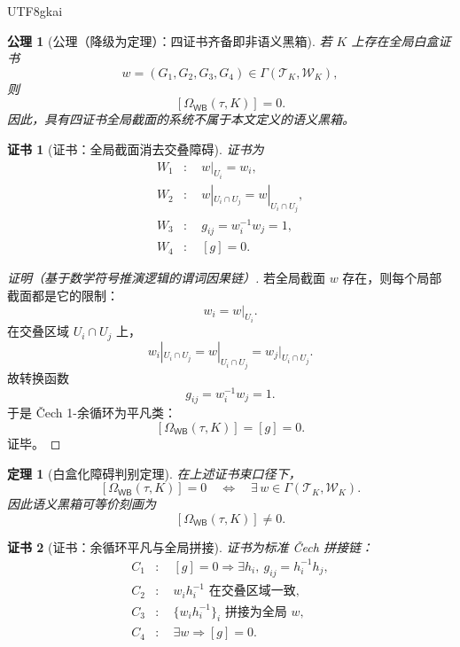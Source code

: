 \documentclass[12pt]{article}
\newtheorem{axiom}{公理}[section]
\newtheorem{theorem}{定理}[section]
\newtheorem{Certificate}{证书}[section]
\newcommand{\WB}{\mathsf{WB}}
\begin{document}
\begin{CJK*}{UTF8}{gkai}
\begin{axiom}[公理（降级为定理）：四证书齐备即非语义黑箱]
\label{ax:tex51-four-cert-whitebox}
若 \(K\) 上存在全局白盒证书
\[
  w=(G_1,G_2,G_3,G_4)\in\Gamma(\mathcal T_K,\mathcal W_K),
\]
则
\[
  [\Omega_{\WB}(\tau,K)]=0.
\]
因此，具有四证书全局截面的系统不属于本文定义的语义黑箱。
\end{axiom}

\begin{Certificate}[证书：全局截面消去交叠障碍]
\label{cert:tex51-four-cert-whitebox}
证书为
\[
\begin{aligned}
  W_1&:\quad w|_{U_i}=w_i,\\
  W_2&:\quad w|_{U_i\cap U_j}=w|_{U_i\cap U_j},\\
  W_3&:\quad g_{ij}=w_i^{-1}w_j=1,\\
  W_4&:\quad [g]=0.
\end{aligned}
\]
\end{Certificate}

\begin{proof}[证明（基于数学符号推演逻辑的谓词因果链）]
若全局截面 \(w\) 存在，则每个局部截面都是它的限制：
\[
  w_i=w|_{U_i}.
\]
在交叠区域 \(U_i\cap U_j\) 上，
\[
  w_i|_{U_i\cap U_j}
  =
  w|_{U_i\cap U_j}
  =
  w_j|_{U_i\cap U_j}.
\]
故转换函数
\[
  g_{ij}=w_i^{-1}w_j=1.
\]
于是 Čech 1-余循环为平凡类：
\[
  [\Omega_{\WB}(\tau,K)]=[g]=0.
\]
证毕。
\end{proof}

\begin{theorem}[白盒化障碍判别定理]
\label{thm:tex51-whitebox-obstruction}
在上述证书束口径下，
\[
  [\Omega_{\WB}(\tau,K)]=0
  \quad\Longleftrightarrow\quad
  \exists\,w\in\Gamma(\mathcal T_K,\mathcal W_K).
\]
因此语义黑箱可等价刻画为
\[
  [\Omega_{\WB}(\tau,K)]\ne 0.
\]
\end{theorem}

\begin{Certificate}[证书：余循环平凡与全局拼接]
\label{cert:tex51-whitebox-obstruction}
证书为标准 Čech 拼接链：
\[
\begin{aligned}
  C_1&:\quad [g]=0
  \Rightarrow \exists h_i,\ g_{ij}=h_i^{-1}h_j,\\
  C_2&:\quad w_i h_i^{-1}\text{ 在交叠区域一致},\\
  C_3&:\quad \{w_i h_i^{-1}\}_i\text{ 拼接为全局 }w,\\
  C_4&:\quad \exists w\Rightarrow [g]=0.
\end{aligned}
\]
\end{Certificate}


\end{CJK*}
\end{document}
